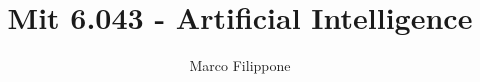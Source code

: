 \documentclass{article}
\begin{document}
\title{Mit 6.043 - Artificial Intelligence}
\author{Marco Filippone}
\maketitle











%

%
\end{document}

